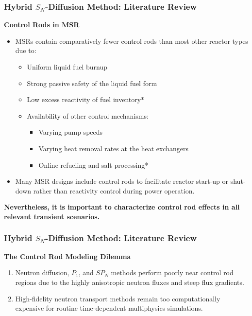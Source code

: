 \begin{frame}
  \frametitle{Hybrid $S_N$-Diffusion Method: Literature Review}
  \textbf{Control Rods in MSR}
  \begin{itemize}
    \item MSRs contain comparatively fewer control rods than most other reactor types due to:
      \begin{itemize}
        \item Uniform liquid fuel burnup
        \item Strong passive safety of the liquid fuel form
        \item Low excess reactivity of fuel inventory*
        \item Availability of other control mechanisms:
        \begin{itemize}
          \item Varying pump speeds
          \item Varying heat removal rates at the heat exchangers
          \item Online refueling and salt processing*
        \end{itemize}
      \end{itemize}
    \item Many MSR designs include control rods to facilitate reactor start-up or shut-down rather
      than reactivity control during power operation.
  \end{itemize}
  \pause
  \textbf{Nevertheless, it is important to characterize control rod effects in all relevant
  transient scenarios.}
\end{frame}

\begin{frame}
  \frametitle{Hybrid $S_N$-Diffusion Method: Literature Review}
  \textbf{The Control Rod Modeling Dilemma}
  \begin{enumerate}
    \item Neutron diffusion, $P_1$, and $SP_N$ methods perform poorly near control rod regions
      due to the highly anisotropic neutron fluxes and steep flux gradients.
    \item High-fidelity neutron transport methods remain too computationally expensive for routine
      time-dependent multiphysics simulations.
  \end{enumerate}
\end{frame}

